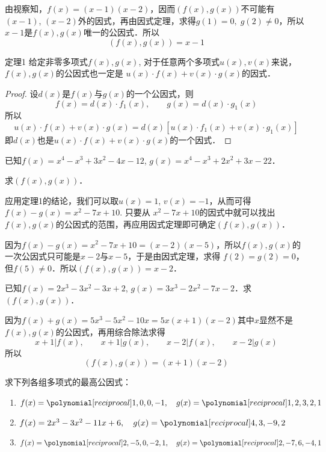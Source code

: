 \begin{solution}
由视察知，$f(x)=(x-1)(x-2)$，因而$(f(x),g(x))$不可能有$(x-1)$, $(x-2)$外的因式，再由因式定理，求得$g(1)=0,\; g(2)\ne 0$，所以$x-1$是$f(x), g(x)$唯一的公因式．所以
\[(f(x),g(x))=x-1\]
\end{solution}

\begin{blk}{定理1}
    给定非零多项式$f(x),g(x)$, 对于任意两个多项式$u(x),v(x)$来说，$f(x),g(x)$的公因式也一定是
$u(x)\cdot f(x)+v(x)\cdot g(x)$的因式．
\end{blk}

\begin{proof}
  设$d(x)$是$f(x)$与$g(x)$的一个公因式，则
\[f (x) =d (x) \cdot f_1 (x),\qquad  g(x)=d(x)\cdot g_1(x)\]
所以
\[u (x) \cdot f (x) +v (x) \cdot g (x) =d (x) [u (x) \cdot f_1 (x) +v (x) \cdot g_1 (x) ]\]
即$d(x)$也是$u(x)\cdot f(x)+v(x)\cdot g(x)$的一个因式．  
\end{proof}

\begin{example}
已知$f(x)=x^4-x^3+3x^2-4x-12$, $g(x)=x^4-x^3+2x^2+3x-22$．

求$(f(x),g(x))$．
\end{example}

\begin{analyze}
应用定理1的结论，我们可以取$u(x)=1$, $v(x)=-1$，从而可得 $f(x)-g(x)=x^2-7x+10$. 只要从 $x^2-7x+10$的因式中就可以找出$f(x),g(x)$的公因式的范围，再应用因式定理即可确定$(f(x),g(x))$．
\end{analyze}

\begin{solution}
因为$f(x)-g(x)=x^2-7x+10=(x-2)(x-5)$，所以$f(x),g(x)$的一次公因式只可能是$x-2$与$x-5$，于是由因式定理，求得
$f(2)=g(2)=0$，但$f(5)\ne 0$．所以$(f(x),g(x))=x-2$．
\end{solution}

\begin{example}
    已知$f(x)=2x^3-3x^2-3x+2$, $g(x)=3x^3-2x^2-7x-2$．求$(f(x),g(x))$．
\end{example}

\begin{solution}
    因为$f(x)+g(x)=5x^3-5x^2-10x=5x(x+1)(x-2)$其中$x$显然不是$f(x),g(x)$的公因式，再用综合除法求得
\[x+1|f(x),\qquad x+1|g(x),\qquad x-2|f(x),\qquad x-2|g(x)\]
所以
\[(f(x),g(x))=(x+1)(x-2)\]
\end{solution}

\begin{ex}
    求下列各组多项式的最高公因式：
\begin{enumerate}
    \item $f(x)=\poly{1,0,0,-1},\quad g(x)=\poly{1,2,3,2,1}$
    \item $f(x)=2x^3-3x^2-11x+6,\quad g(x)=\poly{4,3,-9,2}$
    \item $f(x)=\poly{2,-5,0,-2,1},\quad g(x)=\poly{2,-7,6,-4,1}$
\end{enumerate}
\end{ex}

